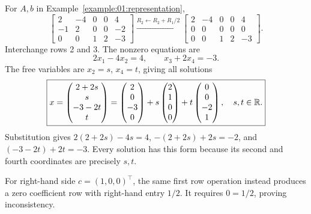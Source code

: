 \begin{example}\label{example:01:all-coefficients}
For \(A,b\) in Example~\ref{example:01:representation},
\[
\left[\begin{array}{rrrr|r}2&-4&0&0&4\\-1&2&0&0&-2\\0&0&1&2&-3\end{array}\right]
\xrightarrow{R_2\leftarrow R_2+R_1/2}
\left[\begin{array}{rrrr|r}2&-4&0&0&4\\0&0&0&0&0\\0&0&1&2&-3\end{array}\right].
\]
Interchange rows 2 and 3. The nonzero equations are
\[
2x_1-4x_2=4,\qquad x_3+2x_4=-3.
\]
The free variables are \(x_2=s\), \(x_4=t\), giving all solutions
\[
\boxed{x=\begin{pmatrix}2+2s\\s\\-3-2t\\t\end{pmatrix}
=\begin{pmatrix}2\\0\\-3\\0\end{pmatrix}
+s\begin{pmatrix}2\\1\\0\\0\end{pmatrix}
+t\begin{pmatrix}0\\0\\-2\\1\end{pmatrix},\quad s,t\in\mathbb R.}
\]
Substitution gives \(2(2+2s)-4s=4\),
\(-(2+2s)+2s=-2\), and \((-3-2t)+2t=-3\).
Every solution has this form because its second and fourth coordinates
are precisely \(s,t\).

For right-hand side \(c=(1,0,0)^\top\), the same first row operation
instead produces a zero coefficient row with right-hand entry \(1/2\).
It requires \(0=1/2\), proving inconsistency.
\end{example}

